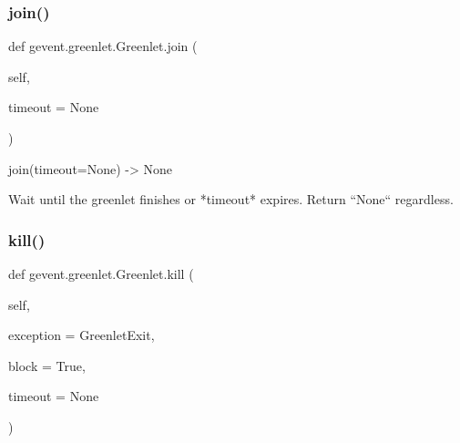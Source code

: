 \subsubsection{\texorpdfstring{join()}{join()}}
{\footnotesize\ttfamily def gevent.\+greenlet.\+Greenlet.\+join (\begin{DoxyParamCaption}\item[{}]{self,  }\item[{}]{timeout = {\ttfamily None} }\end{DoxyParamCaption})}

\begin{DoxyVerb}join(timeout=None) -> None

Wait until the greenlet finishes or *timeout* expires. Return
``None`` regardless.
\end{DoxyVerb}
 \mbox{\label{classgevent_1_1greenlet_1_1_greenlet_a3daff110b6787a38d7bd8fe948d86246}} 
\subsubsection{\texorpdfstring{kill()}{kill()}}
{\footnotesize\ttfamily def gevent.\+greenlet.\+Greenlet.\+kill (\begin{DoxyParamCaption}\item[{}]{self,  }\item[{}]{exception = {\ttfamily GreenletExit},  }\item[{}]{block = {\ttfamily True},  }\item[{}]{timeout = {\ttfamily None} }\end{DoxyParamCaption})}

